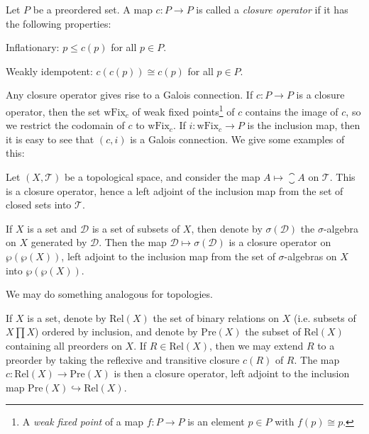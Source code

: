 \documentclass[article, a4paper, 11pt, oneside]{memoir}
\numberwithin{equation}{chapter}
\newcommand{\calT}{\mathcal{T}}
\newcommand{\calD}{\mathcal{D}}
\theoremstyle{myexample}
\theoremstyle{myexamplebreak}
\begin{document}
\begin{definition}
    Let $P$ be a preordered set. A map $c \colon P \to P$ is called a \emph{closure operator} if it has the following properties:
    \begin{enumdef}
        \item Inflationary: $p \leq c(p)$ for all $p \in P$.
        \item Weakly idempotent: $c(c(p)) \cong c(p)$ for all $p \in P$.
    \end{enumdef}
\end{definition}

\newcommand{\wfix}[1]{\mathrm{wFix}_{#1}}
\renewcommand{\powerset}[1]{\wp(#1)}
\newcommand{\rel}[1]{\mathrm{Rel}(#1)}
\newcommand{\preord}[1]{\mathrm{Pre}(#1)}

\begin{examplebreak}
    Any closure operator gives rise to a Galois connection. If $c \colon P \to P$ is a closure operator, then the set $\wfix{c}$ of weak fixed points\footnote{A \emph{weak fixed point} of a map $f \colon P \to P$ is an element $p \in P$ with $f(p) \cong p$.} of $c$ contains the image of $c$, so we restrict the codomain of $c$ to $\wfix{c}$. If $i \colon \wfix{c} \to P$ is the inclusion map, then it is easy to see that $(c,i)$ is a Galois connection. We give some examples of this:
    \begin{enumexample}
        \item Let $(X,\calT)$ be a topological space, and consider the map $A \mapsto \closure{A}$ on $\calT$. This is a closure operator, hence a left adjoint of the inclusion map from the set of closed sets into $\calT$.

        \item If $X$ is a set and $\calD$ is a set of subsets of $X$, then denote by $\sigma(\calD)$ the $\sigma$-algebra on $X$ generated by $\calD$. Then the map $\calD \mapsto \sigma(\calD)$ is a closure operator on $\powerset{\powerset{X}}$, left adjoint to the inclusion map from the set of $\sigma$-algebras on $X$ into $\powerset{\powerset{X}}$.

        We may do something analogous for topologies.

        \item If $X$ is a set, denote by $\rel{X}$ the set of binary relations on $X$ (i.e. subsets of $X \prod X$) ordered by inclusion, and denote by $\preord{X}$ the subset of $\rel{X}$ containing all preorders on $X$. If $R \in \rel{X}$, then we may extend $R$ to a preorder by taking the reflexive and transitive closure $c(R)$ of $R$. The map $c \colon \rel{X} \to \preord{X}$ is then a closure operator, left adjoint to the inclusion map $\preord{X} \hookrightarrow \rel{X}$.
    \end{enumexample}
\end{examplebreak}
\end{document}
